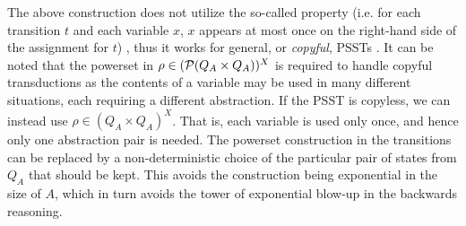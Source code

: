             The above construction  does not utilize the so-called  property (i.e. for each transition $t$ and each variable $x$, $x$ appears at most once on the right-hand side of the assignment for $t$) \cite{AC10,AD11},
            thus it works for general, or \textit{copyful}, PSSTs \cite{FR17}.
            It can be noted that the powerset in
            $\rho \in (\mathcal{P}(Q_A \times Q_A ))^{X}$
            is required to handle copyful transductions as the contents of a variable may be used in many different situations, each requiring a different abstraction.
            If the PSST is copyless, we can instead use
            $\rho \in (Q_A \times Q_A)^{X}$.
            That is, each variable is used only once, and hence only one abstraction pair is needed.
            The powerset construction in the transitions can be replaced by a non-deterministic choice of the particular pair of states from $Q_A$ that should be kept.
            This avoids the construction being exponential in the size of $A$, which in turn avoids the tower of exponential blow-up in the backwards reasoning.


